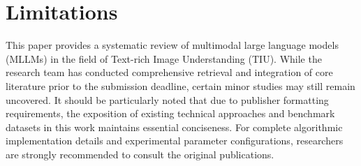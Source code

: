 \section{Limitations}

This paper provides a systematic review of multimodal large language models (MLLMs) in the field of Text-rich Image Understanding (TIU). While the research team has conducted comprehensive retrieval and integration of core literature prior to the submission deadline, certain minor studies may still remain uncovered. It should be particularly noted that due to publisher formatting requirements, the exposition of existing technical approaches and benchmark datasets in this work maintains essential conciseness. For complete algorithmic implementation details and experimental parameter configurations, researchers are strongly recommended to consult the original publications.











